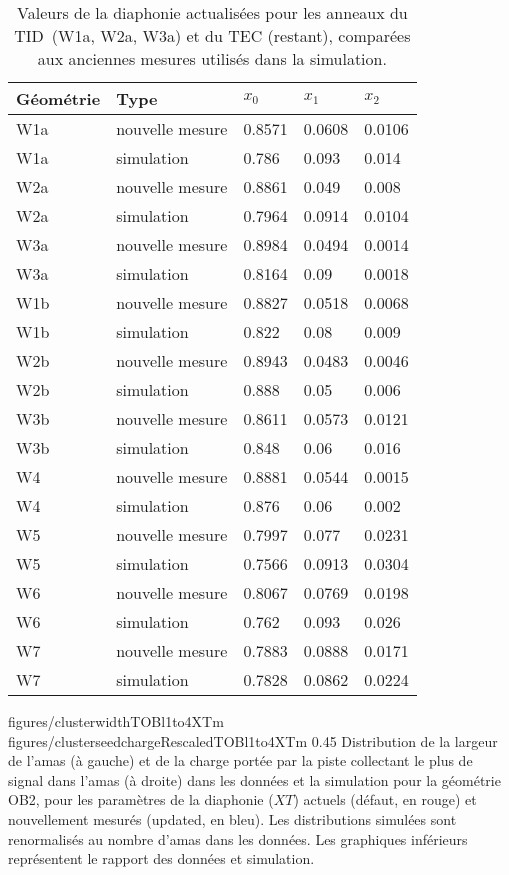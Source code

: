 \begin{table}[h]
\begin{center}
\begin{tabular}{|l|l|l|l|l|}
\hline
Géométrie  & Type & $x_{0}$ & $x_{1}$ & $x_{2}$ \\
\hline
\hline
W1a &  nouvelle mesure & 0.8571 & 0.0608 & 0.0106 \\
W1a &  simulation & 0.786 & 0.093 & 0.014 \\
\hline
W2a &  nouvelle mesure & 0.8861 & 0.049 & 0.008 \\
W2a &  simulation & 0.7964 & 0.0914 & 0.0104 \\
\hline
W3a &  nouvelle mesure & 0.8984 & 0.0494 & 0.0014 \\
W3a &  simulation & 0.8164 & 0.09 & 0.0018 \\
\hline
W1b &  nouvelle mesure & 0.8827 & 0.0518 & 0.0068 \\
W1b &  simulation & 0.822 & 0.08 & 0.009 \\
\hline
W2b &  nouvelle mesure & 0.8943 & 0.0483 & 0.0046 \\
W2b &  simulation & 0.888 & 0.05 & 0.006 \\
\hline
W3b &  nouvelle mesure & 0.8611 & 0.0573 & 0.0121 \\
W3b &  simulation & 0.848 & 0.06 & 0.016 \\
\hline
W4 &  nouvelle mesure & 0.8881 & 0.0544 & 0.0015 \\
W4 &  simulation & 0.876 & 0.06 & 0.002 \\
\hline
W5 &  nouvelle mesure & 0.7997 & 0.077 & 0.0231 \\
W5 &  simulation & 0.7566 & 0.0913 & 0.0304 \\
\hline
W6 &  nouvelle mesure & 0.8067 & 0.0769 & 0.0198 \\
W6 &  simulation & 0.762 & 0.093 & 0.026 \\
\hline
W7 &  nouvelle mesure & 0.7883 & 0.0888 & 0.0171 \\
W7 &  simulation & 0.7828 & 0.0862 & 0.0224 \\
\hline
\end{tabular}
\caption[Table caption text]{ Valeurs de la diaphonie actualisées pour les anneaux du TID~(W1a, W2a, W3a) et du TEC (restant), comparées aux anciennes mesures utilisés dans la simulation. }
\label{tab:measuredXtalkTODTEC2}
\end{center}
\end{table}


                 {figures/clusterwidthTOBl1to4XTm}
                 {figures/clusterseedchargeRescaledTOBl1to4XTm} %
                 {0.45}       %
                 {Distribution de la largeur de l'amas (à gauche) et de la charge portée par la piste collectant le plus de signal dans l'amas (à droite) dans les données et la simulation pour la géométrie OB2, pour les paramètres de la diaphonie ($XT$) actuels (défaut, en rouge) et nouvellement mesurés (updated, en bleu). Les distributions simulées sont renormalisés au nombre d'amas dans les données. Les graphiques inférieurs représentent le rapport des données et simulation. }


